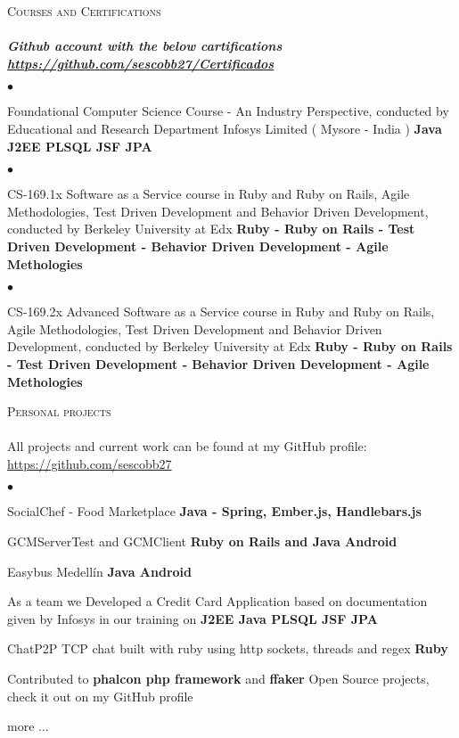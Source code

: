 \documentclass[a4paper]{article}
\newcommand{\lineunder}{\vspace*{-8pt} \\ \hspace*{-18pt} \hrulefill \\}
\newcommand{\header}[1]{{\hspace*{-15pt}\vspace*{6pt}
\textsc{#1}} \vspace*{-6pt} \lineunder}
\newenvironment{achievements}{\begin{list}{$\bullet$}{\topsep 0pt \itemsep
-2pt}}{\vspace*{4pt}\end{list}}
\newcommand{\programming}[1]{{\textbf{#1}}}
\newcommand{\emphasys}[1]{\textbf{\emph{#1}}}
\begin{document}
\newpage

\header{Courses and Certifications}
\emphasys{Github account with the below cartifications \url{https://github.com/sescobb27/Certificados}}
\begin{achievements}
\item Foundational Computer Science Course - An Industry Perspective, conducted by Educational and Research Department Infosys Limited ( Mysore - India )
\programming{Java J2EE PLSQL JSF JPA}
\end{achievements}
\begin{achievements}
\item{CS-169.1x Software as a Service course in Ruby and Ruby on Rails, Agile Methodologies, Test Driven Development and Behavior Driven Development, conducted by Berkeley University at Edx}
\programming{Ruby - Ruby on Rails - Test Driven Development - Behavior Driven Development - Agile Methologies}
\end{achievements}
\begin{achievements}
\item{CS-169.2x Advanced Software as a Service course in Ruby and Ruby on Rails, Agile Methodologies, Test Driven Development and Behavior Driven Development, conducted by Berkeley University at Edx}
\programming{Ruby - Ruby on Rails - Test Driven Development - Behavior Driven Development - Agile Methologies}
\end{achievements}

\header{Personal projects}
All projects and current work can be found at my GitHub profile: \url{https://github.com/sescobb27}
\begin{achievements}
\item{SocialChef - Food Marketplace} \programming{Java - Spring, Ember.js, Handlebars.js}
\item{GCMServerTest and GCMClient} \programming{Ruby on Rails and Java Android}
\item{Easybus Medell\'in }\programming{Java Android}
\item{As a team we Developed a Credit Card Application based on documentation given by Infosys in our training on \programming{J2EE Java PLSQL JSF JPA}}
\item{ChatP2P TCP chat built with ruby using http sockets, threads and regex \programming{Ruby}}
\item{Contributed to \programming{phalcon php framework} and \programming{ffaker} Open Source projects, check it out on my GitHub profile}
\item{more ...}
\end{achievements}
\end{document}
